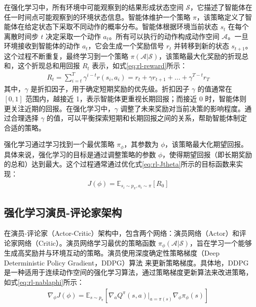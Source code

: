 在强化学习中，所有环境中可能观察到的结果形成状态空间 $\mathcal{S}$，它描述了智能体在任一时间点可能观察到的环境状态信息。智能体维护一个策略 $\pi$，该策略定义了智能体在给定状态下采取不同动作的概率分布。智能体根据环境当前状态 $s_t$ 在每个离散时间步 $t$ 决定采取一个动作 $a_t$。所有可以执行的动作构成动作空间 $\mathcal{A}$。一旦环境接收到智能体的动作 $a_t$，它会生成一个奖励信号 $r_t$ 并转移到新的状态 $s_{t+1}$。这个过程不断重复，最终学习到一个策略 $\pi(\mathcal{A}|\mathcal{S})$，该策略最大化奖励的折现总和，这个折现总和用回报 $R_t$ 表示，如式\eqref{eq:rl-reward}所示：
\begin{equation}
\begin{aligned}
    R_t = \sum_{i=t}^{T}\gamma^{i-t}r(s_i,a_i) = r_t + \gamma r_{t+1} + ... + \gamma^{T-t}r_T
\end{aligned}
\label{eq:rl-reward}
\end{equation}
其中，$\gamma$ 是折扣因子，用于确定短期奖励的优先级。折扣因子 $\gamma$ 的值通常在 $[0, 1]$ 范围内，越接近 1，表示智能体更重视长期回报；而接近 0 时，智能体则更关注近期的回报。在强化学习中，$\gamma$ 调整了未来奖励对当前决策的影响程度。通过合理选择 $\gamma$ 的值，可以平衡探索短期和长期回报之间的关系，帮助智能体制定合适的策略。

强化学习通过学习找到一个最优策略 $\pi_\phi$，其参数为 $\phi$，该策略最大化期望回报。具体来说，强化学习的目标是通过调整策略的参数 $\phi$，使得期望回报（即长期奖励的总和）达到最大。这个过程通常通过优化式\eqref{eq:rl-Jtheta}所示的目标函数来实现：
\begin{equation}
\begin{aligned}
    J(\phi) = \mathbb{E}_{s_i \sim p_\pi, a_i \sim \pi}[R_0]
\end{aligned}
\label{eq:rl-Jtheta}
\end{equation} 

\subsection{强化学习演员-评论家架构}
在演员-评论家（Actor-Critic）架构中，包含两个网络：演员网络（Actor）和评论家网络（Critic）。演员网络学习最优的策略函数 $\pi_\phi(\mathcal{A}|\mathcal{S})$，旨在学习一个能够生成高奖励并与环境互动的策略。演员使用深度确定性策略梯度（Deep Deterministic Policy Gradient，DDPG）算法 \cite{silver2014deterministic} 来更新策略梯度。具体地，DDPG 是一种适用于连续动作空间的强化学习算法，通过策略梯度更新算法来改进策略，如式\eqref{eq:rl-nablaphi}所示：
\begin{equation}
\begin{aligned}
    \nabla_\phi J(\phi)=\mathbb{E}_{s\sim p_\pi}\left[\nabla_aQ^{\pi}(s,a)|_{a=\pi(s)}\nabla_\phi\pi_\phi(s)\right]
\end{aligned}
\label{eq:rl-nablaphi}
\end{equation} 

